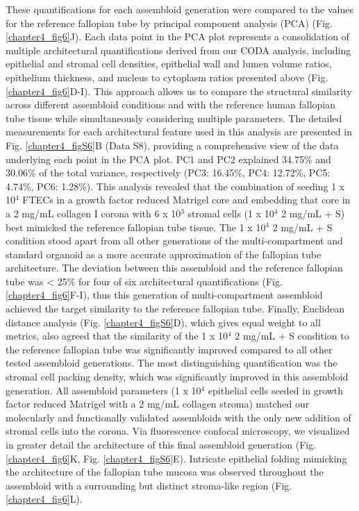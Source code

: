 \begin{refsection}
    These quantifications for each assembloid generation were compared to the values for the reference fallopian tube by principal component analysis (PCA) (Fig. \ref{chapter4_fig6}J). Each data point in the PCA plot represents a consolidation of multiple architectural quantifications derived from our CODA analysis, including epithelial and stromal cell densities, epithelial wall and lumen volume ratios, epithelium thickness, and nucleus to cytoplasm ratios presented above (Fig. \ref{chapter4_fig6}D-I). This approach allows us to compare the structural similarity across different assembloid conditions and with the reference human fallopian tube tissue while simultaneously considering multiple parameters. The detailed measurements for each architectural feature used in this analysis are presented in Fig. \ref{chapter4_figS6}B (Data S8), providing a comprehensive view of the data underlying each point in the PCA plot. PC1 and PC2 explained 34.75\% and 30.06\% of the total variance, respectively (PC3: 16.45\%, PC4: 12.72\%, PC5: 4.74\%, PC6: 1.28\%). This analysis revealed that the combination of seeding 1 x 10$^4$ FTECs in a growth factor reduced Matrigel core and embedding that core in a 2 mg/mL collagen I corona with 6 x 10$^3$ stromal cells (1 x 10$^4$ 2 mg/mL + S) best mimicked the reference fallopian tube tissue. The 1 x 10$^4$ 2 mg/mL + S condition stood apart from all other generations of the multi-compartment and standard organoid as a more accurate approximation of the fallopian tube architecture. The deviation between this assembloid and the reference fallopian tube was < 25\% for four of six architectural quantifications (Fig. \ref{chapter4_fig6}F-I), thus this generation of multi-compartment assembloid achieved the target similarity to the reference fallopian tube. Finally, Euclidean distance analysis (Fig. \ref{chapter4_figS6}D), which gives equal weight to all metrics, also agreed that the similarity of the 1 x 10$^4$ 2 mg/mL + S condition to the reference fallopian tube was significantly improved compared to all other tested assembloid generations. The most distinguishing quantification was the stromal cell packing density, which was significantly improved in this assembloid generation. All assembloid parameters (1 x 10$^4$ epithelial cells seeded in growth factor reduced Matrigel with a 2 mg/mL collagen stroma) matched our molecularly and functionally validated assembloids with the only new addition of stromal cells into the corona. Via fluorescence confocal microscopy, we visualized in greater detail the architecture of this final assembloid generation (Fig. \ref{chapter4_fig6}K, Fig. \ref{chapter4_figS6}E). Intricate epithelial folding mimicking the architecture of the fallopian tube mucosa was observed throughout the assembloid with a surrounding but distinct stroma-like region (Fig. \ref{chapter4_fig6}L).
    

\end{refsection}
